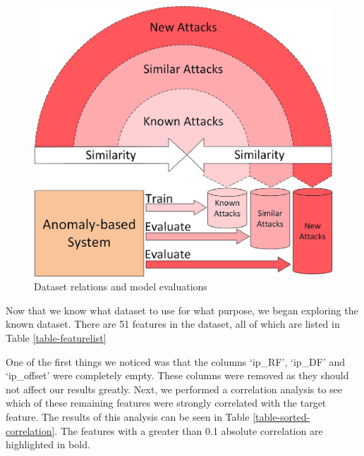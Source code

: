 \begin{figure}[!htb]
    \centering
    \includegraphics{figures/uploads/known_similar_new_attacks.jpg}
    \caption{Dataset relations and model evaluations}
    \label{figure-known-similar-new}
\end{figure}

Now that we know what dataset to use for what purpose, we began exploring the known dataset. There are 51 features in the dataset, all of which are listed in Table \ref{table-featurelist}




One of the first things we noticed was that the columns `ip\_RF', `ip\_DF' and `ip\_offset' were completely empty. These columns were removed as they should not affect our results greatly. Next, we performed a correlation analysis to see which of these remaining features were strongly correlated with the target feature. The results of this analysis can be seen in Table \ref{table-sorted-correlation}. The features with a greater than 0.1 absolute correlation are highlighted in bold.




